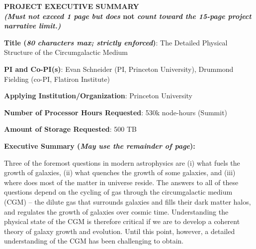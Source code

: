 \documentclass[11pt,letterpaper,english]{article}
\begin{document}
\setlength{\parindent}{0in} %

\pagestyle{fancy}   \renewcommand{%
\headrulewidth}{0.0pt}

\begin{center}
\bf {PROJECT EXECUTIVE SUMMARY} \\
{\bf \small {\em (Must not exceed 1 page but does} not {\em count toward the 15-page project narrative limit.)}}
\end{center}


\bigskip

\textbf{Title (\emph{80 characters max; strictly enforced})}: The Detailed Physical Structure of the Circumgalactic Medium \smallskip

\textbf{PI and Co-PI(s)}: Evan Schneider (PI, Princeton University), Drummond Fielding (co-PI, Flatiron Institute) \smallskip

\textbf{Applying Institution/Organization}: Princeton University \smallskip

\textbf{Number of Processor Hours Requested}: 530k node-hours (Summit) \smallskip

\textbf{Amount of Storage Requested}: 500 TB \smallskip

\textbf{Executive Summary ({\emph{May use the remainder of page}}):} \\

\vspace{.15in}

Three of the foremost questions in modern astrophysics are (i) what fuels the growth of galaxies, (ii) what quenches the growth of some galaxies, and (iii) where does most of the matter in universe reside. The answers to all of these questions depend on the cycling of gas through the circumgalactic medium (CGM) -- the dilute gas that surrounds galaxies and fills their dark matter halos, and regulates the growth of galaxies over cosmic time. Understanding the physical state of the CGM is therefore critical if we are to develop a coherent theory of galaxy growth and evolution. Until this point, however, a detailed understanding of the CGM has been challenging to obtain.
\vspace{.15in}
\end{document}
